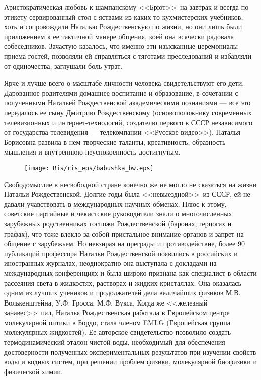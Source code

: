 Аристократическая любовь к шампанскому <<Брют>>\ на завтрак и всегда по этикету сервированный стол с яствами из каких-то кухмистерских учебников, хоть и сопровождали Наталью Рождественскую по жизни, но они лишь были приложением к ее тактичной манере общения, коей она всячески радовала собеседников. Зачастую казалось, что именно эти изысканные церемониалы приема гостей, позволяли ей справляться с тяготами преследований и избавляли от одиночества, заглушали боль утрат.

Ярче и лучше всего о масштабе личности человека свидетельствуют его дети. Дарованное родителями домашнее воспитание и образование, в сочетании с полученными Натальей Рождественской академическими познаниями --- все это передалось ее сыну Дмитрию Рождественскому (основоположнику современных телевизионных и интернет-технологий, создателю первого в СССР независимого от государства телевидения --- телекомпании <<Русское видео>>). Наталья Борисовна развила в нем творческие таланты, креативность, образность мышления и внутреннюю неуспокоенность достигнутым.

\begin{figure}[tbp]
\centerline{\hbox{\texttt{[image: Ris/ris\_eps/babushka\_bw.eps]}}}
\end{figure}

Свободомыслие в несвободной стране конечно же не могло не сказаться на жизни Натальи Рождественской. Долгие годы была <<невыездной>>\ из СССР, ей не давали учавствовать в  международных научных обменах. Плюс к этому, советские партийные и чекистские руководители знали о многочисленных зарубежных родственниках госпожи Рождественской (баронах, герцогах и графах), что тоже влекло за собой пристальное внимание органов и запрет на общение с зарубежьем. Но невзирая на преграды и противодействие, более 90 публикаций профессора Натальи Рождественской появились в российских и иностранных журналах, неоднократно она выступала с докладами на международных конференциях и была широко признана как специалист в области рассеяния света в жидкостях, растворах и жидких кристаллах. Она оказалась одним из лучших учеников и продолжателей дела величайших физиков М.В. Волькенштейна, У.Ф. Гросса, М.Ф. Вукса, Когда же <<железный занавес>>\ пал, Наталья Рождественская работала в Европейском центре молекулярной оптики в Бордо, стала членом EMLG (Европейская группа молекулярных жидкостей). Ее авторское свидетельство позволило создать термодинамический эталон чистой воды, необходимый для обеспечения достоверности полученных экспериментальных результатов при изучении свойств воды и водных систем, при решении проблем физики, молекулярной биофизики и физической химии.


